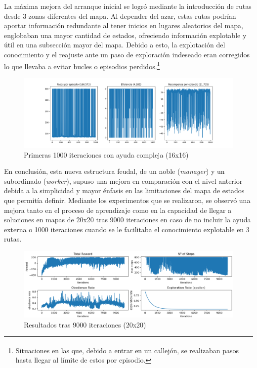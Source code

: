 \documentclass[letterpaper]{article} %
\begin{document}
La máxima mejora del arranque inicial se logró mediante la introducción de rutas desde 3 zonas diferentes del mapa. Al depender del azar, estas
 rutas podrían aportar información redundante al tener inicios en lugares aleatorios del mapa, englobaban una mayor cantidad de estados, ofreciendo
  información explotable y útil en una subsección mayor del mapa. Debido a esto, la explotación del conocimiento y el reajuste ante un paso de 
  exploración indeseado eran corregidos lo que llevaba a evitar bucles o episodios perdidos.\footnote{\textsuperscript{}Situaciones en las que, 
  debido a entrar en un callejón, se realizaban pasos hasta llegar al límite de estos por episodio.}

\begin{figure}[H]
    \centering
    \includegraphics[width=0.9\columnwidth]{ayuda_externa_3paths.png}
    \caption{Primeras 1000 iteraciones con ayuda compleja (16x16)\label{fig:FuN3}}
\end{figure}

En conclusión, esta nueva estructura feudal, de un noble (\textit{manager}) y un subordinado (\textit{worker}), supuso una mejora en comparación con el nivel anterior debida a la simplicidad y mayor énfasis en las limitaciones del mapa de estados que permitía definir. Mediante los experimentos que se realizaron, se observó una mejora tanto en el proceso de aprendizaje como en la capacidad de llegar a soluciones en mapas de 20x20 tras 9000 iteraciones en caso de no incluir la ayuda externa o 1000 iteraciones cuando se le facilitaba el conocimiento explotable en 3 rutas. 

\begin{figure}[H]
    \centering
    \includegraphics[width=0.9\columnwidth]{QL_resumen_final.png}
    \caption{Resultados tras 9000 iteraciones (20x20)}
    \label{fig:FuN1}
\end{figure}
\end{document}
